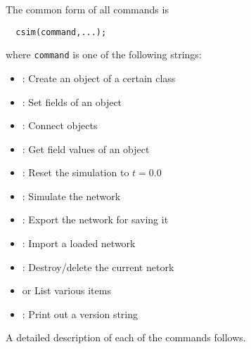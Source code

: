 
The common form of all \csim commands is 
\begin{verbatim}
  csim(command,...);
\end{verbatim}
where \texttt{command} is one of the following strings:

\begin{itemize}
\setlength{\itemsep}{-0.8ex plus 0.1ex minus 0.1ex}
\setlength{\parsep}{0.0ex plus 0.1ex minus 0.1ex}
\item \texttt{} : Create an object of a certain class
\item \texttt{} : Set fields of an object
\item \texttt{} : Connect objects
\item \texttt{} : Get field values of an object
\item \texttt{} : Reset the simulation to $t=0.0$
\item \texttt{} : Simulate the network
\item \texttt{} : Export the network for saving it
\item \texttt{} : Import a loaded network
\item \texttt{} : Destroy/delete the current netork
\item \texttt{} or \texttt{} List various items
\item \texttt{} : Print out a version string
\end{itemize}

A detailed description of each of the commands follows. 

